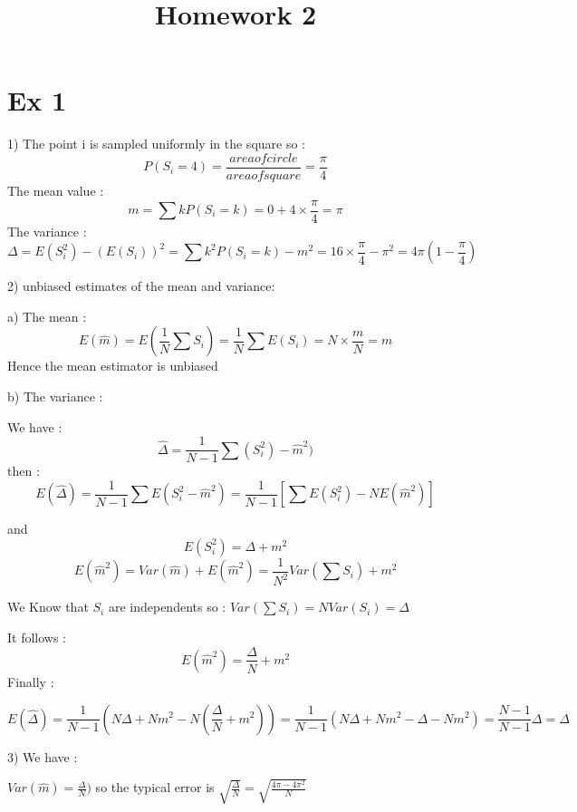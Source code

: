 \documentclass{article}
\title{Homework 2}
\begin{document}
\section{Ex 1 } 
1) The point i is sampled uniformly in the square so : 
$$P(S_i=4)= \frac{area of circle}{area of square}= \frac{\pi}{4}$$
The mean value : 
$$ m= \sum k P(S_i=k) = 0 + 4 \times 
\frac{\pi}{4}= \pi $$ 
The variance : 
 $$\Delta = E(S_i^2)-(E(S_i))^2= \sum k^2 P(S_i=k) -m^2 = 16 \times \frac{\pi}{4} - \pi^2 = 4\pi(1-\frac{\pi}{4})$$
 

2) unbiased estimates of the mean and variance: 

a) The mean : 
$$ E(\hat {m}) = E(\frac{1}{N} \sum S_i ) = \frac{1}{N} \sum E(S_i) = N \times \frac{m}{N}=m$$ Hence the mean estimator is unbiased

b) The variance : 

   We have : 
   $$\hat{\Delta}= \frac{1}{N-1} \sum (S_i^2)-\hat{m}^2)$$ 
   then : 
   $$ E(\hat{\Delta})= \frac{1}{N-1} \sum E(S_i^2-\hat{m}^2) = \frac{1}{N-1} [\sum E(S_i^2) - N E(\hat{m}^2)]$$

 and 
      $$ E(S_i^2)= \Delta + m^2 $$ 
      $$ E(\hat{m}^2) = Var (\hat{m}) + E(\hat{m}^2) = \frac{1}{N^2}Var(\sum S_i) + m^2$$ 
      
 We Know that  {$S_i$} are independents  so : $Var(\sum S_i) = N Var(S_i)=\Delta$
 
 It follows : 
 $$ E(\hat{m}^2) = \frac{\Delta}{N} + m^2$$
 Finally : 
 
$$ E(\hat{\Delta}) = \frac{1}{N-1} ( N\Delta +Nm^2 -N(\frac{\Delta}{N}+m^2)) = \frac{1}{N-1} (N\Delta + Nm^2-\Delta -N m^2) = \frac{N-1}{N-1} \Delta = \Delta $$

3) 
We have : 

$Var( \hat{m})= \frac{\Delta}{N})$ so the typical error is $\sqrt{\frac{\Delta}{N} } = \sqrt{\frac{4\pi-4\pi^2}{N} }  $ 
\end{document}
